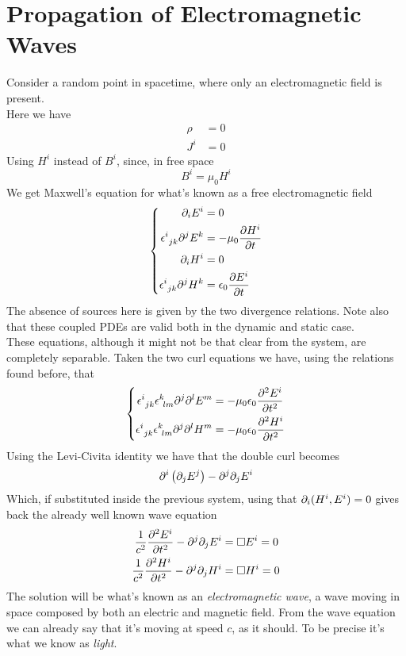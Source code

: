\documentclass[../electromagnetism.tex]{subfiles}
\begin{document}
\section{Propagation of Electromagnetic Waves}
Consider a random point in spacetime, where only an electromagnetic field is present.\\
Here we have
\begin{equation*}
	\begin{aligned}
		\rho&=0\\
		J^i&=0
	\end{aligned}
\end{equation*}
Using $H^i$ instead of $B^i$, since, in free space
\begin{equation*}
	B^i=\mu_0H^i
\end{equation*}
We get Maxwell's equation for what's known as a free electromagnetic field
\begin{equation}
	\left\{ \begin{aligned}
		\partial_iE^i&=0\\
		\epsilon^{i}_{\ jk}\partial^jE^k&=-\mu_0\pdv{H^i}{t}\\
		\partial_iH^i&=0\\
		\epsilon^{i}_{\ jk}\partial^jH^k&=\epsilon_0\pdv{E^i}{t}
	\end{aligned}\right.
	\label{eq:freespacemaxwell}
\end{equation}
The absence of sources here is given by the two divergence relations. Note also that these coupled PDEs are valid both in the dynamic and static case.\\
These equations, although it might not be that clear from the system, are completely separable. Taken the two curl equations we have, using the relations found before, that
\begin{equation*}
	\left\{ \begin{aligned}
			\epsilon^{i}_{\ jk}\epsilon^{k}_{\ lm}\partial^j\partial^lE^m&= -\mu_0\epsilon_0\pdv[2]{E^i}{t}\\
			\epsilon^{i}_{\ jk}\epsilon^{k}_{\ lm}\partial^j\partial^lH^m&= -\mu_0\epsilon_0\pdv[2]{H^i}{t}
	\end{aligned}\right.
\end{equation*}
Using the Levi-Civita identity we have that the double curl becomes
\begin{equation*}
	\partial^i\left( \partial_jE^j \right)-\partial^j\partial_jE^i
\end{equation*}
Which, if substituted inside the previous system, using that $\partial_i(H^i,E^i)=0$ gives back the already well known wave equation
\begin{equation}
	\begin{aligned}
		\frac{1}{c^2}\pdv[2]{E^i}{t}-\partial^j\partial_jE^i&=\square E^i= 0\\
		\frac{1}{c^2}\pdv[2]{H^i}{t}-\partial^j\partial_jH^i&=\square H^i= 0
	\end{aligned}
	\label{eq:emwaveeq}
\end{equation}
The solution will be what's known as an \textit{electromagnetic wave}, a wave moving in space composed by both an electric and magnetic field. From the wave equation we can already say that it's moving at speed $c$, as it should. To be precise it's what we know as \emph{light}.
\end{document}
